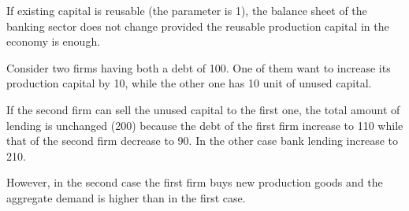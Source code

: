 \documentclass{article}
\begin{document}
If existing capital is reusable (the parameter is 1), the balance sheet of the banking sector does not change provided the reusable production capital in the economy is enough.

Consider two firms having both a debt of 100. One of them want to increase its production capital by 10, while the other one has 10 unit of unused capital. 

If the second firm can sell the unused capital to the first one, the total amount of lending is unchanged (200) because the debt of the first firm increase to 110 while that of the second firm decrease to 90.
In the other case bank lending increase to 210.

However, in the second case the first firm buys new production goods and the aggregate demand is higher than in the first case. 
\end{document}
